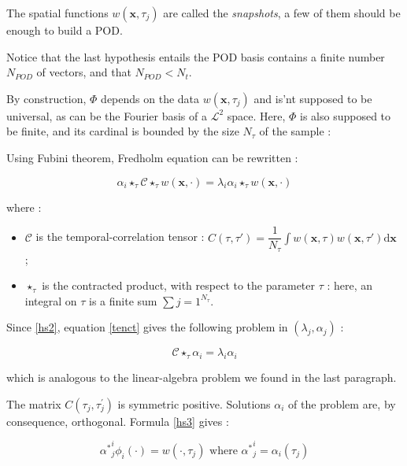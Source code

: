 The spatial functions $w(\mathbf{x}, \tau_j)$ are called the \emph{snapshots}, a few of them should be enough to build a POD.

\par
Notice that the last hypothesis entails the POD basis contains a finite number $N_{POD}$ of vectors, and that $N_{POD}<N_t$.

\par
By construction, $\Phi$ depends on the data $w(\mathbf{x},\tau_j)$ and is'nt supposed to be universal, as can be the Fourier basis of a $\mathcal{L}^2$ space. %
Here, $\Phi$ is also supposed to be finite, and its cardinal is bounded by the size $N_{\tau}$ of the sample :


Using Fubini theorem, Fredholm equation can be rewritten :

\begin{equation}\label{tenct}
\alpha_i\star_{\tau}\mathcal{C}\star_{\tau}w(\mathbf{x},\cdot)=\lambda_i\alpha_i\star_{\tau}w(\mathbf{x},\cdot)
\end{equation}

where :
\begin{itemize}
\item $\mathcal{C}$ is the temporal-correlation tensor : $\displaystyle C(\tau,\tau ')=\dfrac{1}{N_{\tau}}\int w(\mathbf{x},\tau)w(\mathbf{x},\tau')\text{d}\mathbf{x}$ ;
\item $\star_{\tau}$ is the contracted product, with respect to the parameter $\tau$ : here, an integral on $\tau$ is a finite sum $\sum\limits{j=1}^{N_{\tau}}$.
\end{itemize}

Since \ref{hs2}, equation \ref{tenct} gives the following problem in $(\lambda_j , \alpha_j)$ :

\begin{equation}\label{tenct}
\mathcal{C}\star_{\tau}\alpha_i\mathbf=\lambda_i\alpha_i
\end{equation}

which is analogous to the linear-algebra problem we found in the last paragraph.

\par
The matrix $C(\tau_j,\tau_j^{'})$ is symmetric positive. Solutions $\alpha_i$ of the problem are, by consequence, %
orthogonal. Formula \ref{hs3} gives :

\[{\alpha^{\ast}}_j^i\phi_i(\cdot )=w(\cdot ,\tau_j)\text{ where ${\alpha^{\ast}}_j^i=\alpha_i(\tau_j)$}\]

